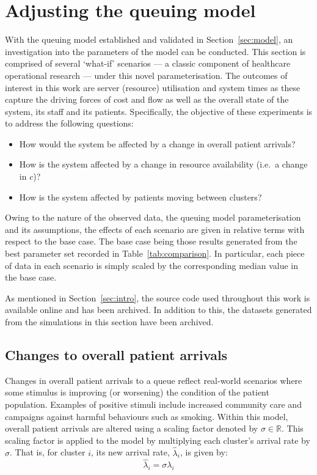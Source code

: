 \section{Adjusting the queuing model}\label{sec:scenarios}

With the queuing model established and validated in Section~\ref{sec:model}, an
investigation into the parameters of the model can be conducted. This section is
comprised of several `what-if' scenarios --- a classic component of healthcare
operational research --- under this novel parameterisation. The outcomes of
interest in this work are server (resource) utilisation and system times as
these capture the driving forces of cost and flow as well as the overall state
of the system, its staff and its patients.  Specifically, the objective of these
experiments is to address the following questions:
\begin{itemize}
    \item How would the system be affected by a change in overall patient
        arrivals?
    \item How is the system affected by a change in resource availability (i.e.\
        a change in \(c\))?
    \item How is the system affected by patients moving between clusters?
\end{itemize}

Owing to the nature of the observed data, the queuing model parameterisation
and its assumptions, the effects of each scenario are given in relative terms
with respect to the base case. The base case being those results generated from
the best parameter set recorded in Table~\ref{tab:comparison}. In particular,
each piece of data in each scenario is simply scaled by the corresponding median
value in the base case.

As mentioned in Section~\ref{sec:intro}, the source code used throughout this
work is available online and has been archived. %
In addition to this, the datasets generated from the simulations in this section
have been archived. %


\subsection{Changes to overall patient arrivals}\label{subsec:arrivals}

Changes in overall patient arrivals to a queue reflect real-world scenarios
where some stimulus is improving (or worsening) the condition of the patient
population. Examples of positive stimuli include increased community care and
campaigns against harmful behaviours such as smoking. Within this model, overall
patient arrivals are altered using a scaling factor denoted by
\(\sigma\in\mathbb{R}\). This scaling factor is applied to the model by
multiplying each cluster's arrival rate by \(\sigma\). That is, for cluster
\(i\), its new arrival rate, \(\hat\lambda_i\), is given by:
\begin{equation}\label{eq:lambda}
    \hat\lambda_{i} = \sigma\lambda_i
\end{equation}

